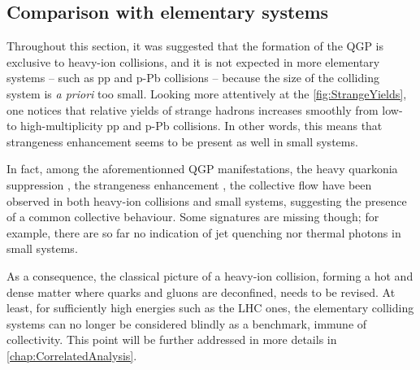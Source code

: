 \subsection{Comparison with elementary systems}
\label{subsec:ComparisonPP}

Throughout this section, it was suggested that the formation of the QGP is exclusive to heavy-ion collisions, and it is not expected in more elementary systems -- such as pp and p-Pb collisions -- because the size of the colliding system is \textit{a priori} too small. Looking more attentively at the \fig\ref{fig:StrangeYields}, one notices that relative yields of strange hadrons increases smoothly from low- to high-multiplicity pp and p-Pb collisions. In other words, this means that strangeness enhancement seems to be present as well in small systems.

In fact, among the aforementionned QGP manifestations, the heavy quarkonia suppression \cite{adamCentralityDependencePsi2016}, the strangeness enhancement \cite{alicecollaborationEnhancedProductionMultistrange2017}, the collective flow \cite{schotterQCDLHC20222022} have been observed in both heavy-ion collisions and small systems, suggesting the presence of a common collective behaviour. Some signatures are missing though; for example, there are so far no indication of jet quenching nor thermal photons in small systems.

As a consequence, the classical picture of a heavy-ion collision, forming a hot and dense matter where quarks and gluons are deconfined, needs to be revised. At least, for sufficiently high energies such as the LHC ones, the elementary colliding systems can no longer be considered blindly as a benchmark, immune of collectivity. This point will be further addressed in more details in \chap\ref{chap:CorrelatedAnalysis}.



